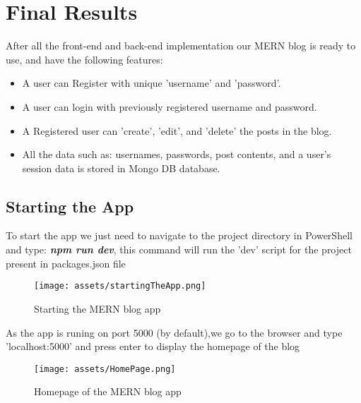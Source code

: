 \documentclass[12pt]{article}
\begin{document}


\clearpage

\clearpage


\section{Final Results}
After all the front-end and back-end implementation our MERN blog is ready to use, and have the following features:

\begin{itemize}[noitemsep]
  \itemsep0.5em
  
  \item A user can Register with unique 'username' and 'password'.
  \item A user can login with previously registered username and password.
  \item A Registered user can 'create', 'edit', and 'delete' the posts in the blog.
  \item All the data such as: usernames, passwords, post contents, and a user's session data is stored in Mongo DB database.

\end{itemize}

\subsection{Starting the App}
To start the app we just need to navigate to the project directory in PowerShell and type: \textbf{\textit{npm run dev}}, this command will run the 'dev' script for the project present in packages.json file

\begin{figure}[H]
    \centering
    \texttt{[image: assets/startingTheApp.png]}
    \caption{Starting the MERN blog app}
    \label{fig:logo}
\end{figure}

As the app is runing on port 5000 (by default),we go to the browser and type 'localhost:5000' and press enter to display the homepage of the blog

\begin{figure}[H]
    \centering
    \texttt{[image: assets/HomePage.png]}
    \caption{Homepage of the MERN blog app}
    \label{fig:logo}
\end{figure}
\end{document}
